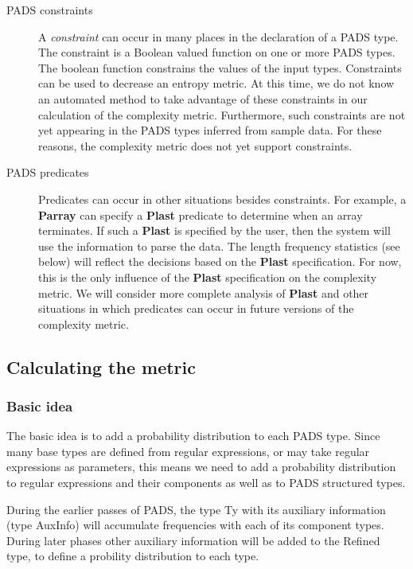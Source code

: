 \begin{description}
\item [PADS constraints]
A \textit{constraint} can occur in many places in the declaration of a
PADS type. The constraint is a Boolean valued function on one or more
PADS types. The boolean function constrains the values of the input
types. Constraints can be used to decrease an entropy metric. At this
time, we do not know an automated method to take advantage of these
constraints in our calculation of the complexity metric. Furthermore,
such constraints are not yet appearing in the PADS types inferred from
sample data. For these reasons, the complexity metric does not yet
support constraints.

\item [PADS predicates]
Predicates can occur in other situations besides constraints. For
example, a \textbf{Parray} can specify a \textbf{Plast} predicate to
determine when an array terminates. If such a \textbf{Plast} is
specified by the user, then the system will use the information to
parse the data. The length frequency statistics (see below) will
reflect the decisions based on the \textbf{Plast} specification. For
now, this is the only influence of the \textbf{Plast} specification on
the complexity metric. We will consider more complete analysis of
\textbf{Plast} and other situations in which predicates can occur in
future versions of the complexity metric.

\end{description}

\subsection{Calculating the metric}

\subsubsection{Basic idea}

The basic idea is to add a probability distribution to each PADS type.
Since many base types are defined from regular expressions, or may take
regular expressions as parameters, this means we need to add a probability
distribution to regular expressions and their components as well as to
PADS structured types.

During the earlier passes of PADS, the type \textsf{Ty} with its
auxiliary information (type \textsf{AuxInfo}) will accumulate
frequencies with each of its component types. During later phases
other auxiliary information will be added to the \textsf{Refined}
type, to define a probility distribution to each type.

